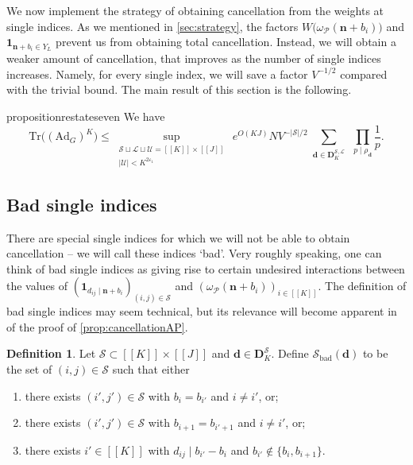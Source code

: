 \documentclass[11pt]{amsart}
\theoremstyle{definition}
\newtheorem{definition}[theorem]{Definition}
\renewcommand{\leq}{\leqslant}
\newcommand{\sinterval}[1]{[\![#1]\!] }
\newcommand{\ind}[1]{\mathbf{1}_{#1}}
\newcommand{\eps}{\varepsilon}
\newcommand{\Ad}{\mathrm{Ad}}
\newcommand{\Tr}{\mathrm{Tr}}
\newcommand{\primes}{\mathcal{P}}
\renewcommand{\d}{\boldsymbol{d}}
\newcommand{\pcomp}[2]{d_{#1#2}}
\newcommand{\n}{\mathbf{n}}
\newcommand{\cstU}{2\eps_1}
\newcommand{\curlyL}{V}
\newcommand{\graph}{G}
\newcommand{\sommespart}{b}
\newcommand{\fprod}[1]{\rho_{#1}}
\newcommand{\pall}{\fprod{\d}}
\newcommand{\lit}{\mathcal{L}}
\newcommand{\unlit}{\mathcal{U}}
\newcommand{\s}{\mathcal{S}}
\newcommand{\fancyD}{\mathbf{D}}
\newcommand{\Ds}{\fancyD^{\s}_{\!\repK}}
\newcommand{\Dss}{\fancyD^{\s,\lit}_{\!\repK}}
\newcommand{\elln}{L}
\newcommand{\Y}{Y_{\!\elln}}
\newcommand{\repR}{J}
\newcommand{\repK}{K}
\newcommand{\newK}{\sinterval{K}}
\newcommand{\newR}{\sinterval{J}}
\newcommand{\kbad}{\s_{\mathrm{bad}}(\d)}
\newcommand{\newerKR}{\newK\times\newR}
\begin{document}
We now implement the strategy of obtaining cancellation from the weights at single indices. As we mentioned in \cref{sec:strategy}, the factors ${W\big(\omega_{\primes}(\n+\sommespart_i)\big)}$ and ${\ind{\n+\sommespart_i\in \Y}}$ prevent us from obtaining total cancellation. Instead, we will obtain a weaker amount of cancellation, that improves as the number of single indices increases. Namely, for every single index, we will save a factor $\curlyL^{-1/2}$ compared with the trivial bound. The main result of this section is the following.

\begin{restatable}{proposition}{restateseven}
\label{lem:reductiontocountingpb}
We have
\begin{equation*}
\Tr \big((\Ad_{\graph})^{\repK}\big) \leq  \sup_{\substack{\s\sqcup \lit\sqcup \unlit = \newerKR\\ |\unlit| <\repK^{\cstU}}}\,e^{O(\repK \repR)} N \curlyL^{-|\s|/2} \sum_{\substack{\d\in \Dss}}\,\prod_{p\mid \pall} \frac{1}{p}.
\end{equation*}
\end{restatable}


\subsection{Bad single indices}

There are special single indices for which we will not be able to obtain cancellation -- we will call these indices `bad'. Very roughly speaking, one can think of bad single indices as giving rise to certain undesired interactions between the values of $(\ind{\pcomp{i}{j}\mid \n+\sommespart_i})_{(i,j)\in \s}$ and ${(\omega_{\primes}(\n+\sommespart_i))_{i\in \newK}}$. The definition of bad single indices may seem technical, but its relevance will become apparent in of the proof of \cref{prop:cancellationAP}. 

\begin{definition}
\label{def:badsingle}
Let $\s\subset \newerKR$ and $\d\in \Ds$. Define $\kbad$ to be the set of $(i, j)\in \s$ such that either
\begin{enumerate}
	\item \label{item:bad1} there exists $(i',j')\in \s$ with $\sommespart_i = \sommespart_{i'}$ and $i\neq i'$, or;
	\item \label{item:bad2} there exists $(i',j')\in \s$ with $\sommespart_{i+1} = \sommespart_{i'+1}$ and $i\neq i'$, or;
	\item \label{item:bad3} there exists $i' \in \newK$ with $\pcomp{i}{j}\mid \sommespart_{i'} - \sommespart_i$ and $\sommespart_{i'} \not\in \{\sommespart_i, \sommespart_{i+1}\}$.
\end{enumerate}
\end{definition}
\end{document}
